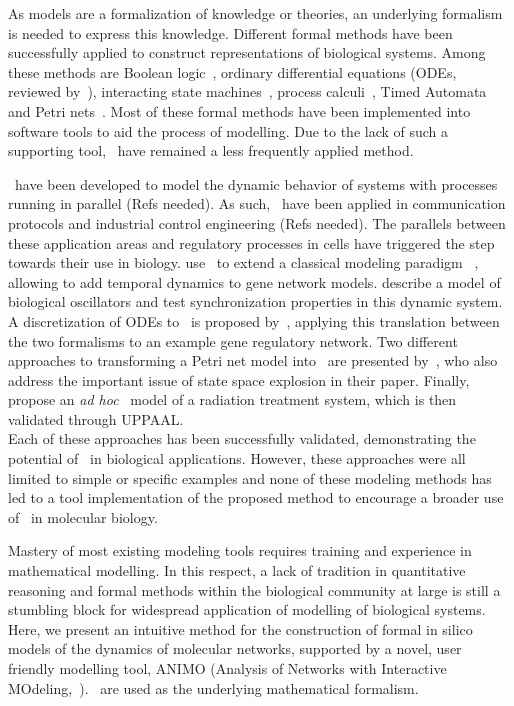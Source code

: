 As models are a formalization of knowledge or theories, an underlying formalism is needed to express
this knowledge. Different formal methods have been successfully applied to construct representations
of biological systems. Among these methods are Boolean logic~\citep{boolean-networks-flower,boolean-networks2},
ordinary differential equations (ODEs, reviewed by~\citealp[]{hidde-review}),
interacting state machines~\citep{interacting-sm1,interacting-sm2},
process calculi~\citep{blenx,bio-pepa}, Timed Automata~\citep{ta-siebert,bartocci-oscillators,
oded-ode-ta-discretization} and Petri nets~\citep{petri-nets,petri-nets2}.
Most of these formal methods have been implemented into software tools to aid the process
of modelling. Due to the lack of such a supporting tool, \tas\ have remained a less 
frequently applied method.

\tas\ have been developed to model the dynamic behavior of systems with processes running in parallel (Refs needed). 
As such, \tas\ have been applied in communication protocols and industrial control engineering (Refs needed). The 
parallels between these application areas and regulatory processes in cells have triggered the step towards 
their use in biology.
\cite{ta-siebert} use \tas\ to extend a classical modeling paradigm
~\citep{thomas-formalism}, allowing to add temporal dynamics to gene network models.
\cite{bartocci-oscillators} describe a model of biological oscillators and test 
synchronization properties in this dynamic system.
A discretization of ODEs to \tas\ is proposed by~\citet{oded-ode-ta-discretization}, applying
this translation between the two formalisms to an example gene regulatory network. Two 
different approaches to transforming
a Petri net model into \tas\ are presented by~\citet{ta-giapponesi},
who also address the important issue of state space explosion in their paper.
Finally, \cite{ta-radiazioni} propose an \emph{ad hoc} \tas\ model of a radiation treatment
system, which is then validated through UPPAAL.\\
Each of these approaches has been successfully validated, demonstrating the potential of \tas\
in biological applications. However, these approaches were all limited to simple
or specific examples and none of these modeling methods
has led to a tool implementation of the proposed method to encourage a broader use
of \tas\ in molecular biology.

Mastery of most existing modeling tools requires training and experience in mathematical modelling. 
In this respect, a lack of tradition in quantitative
reasoning and formal methods within the biological community at large is still a stumbling block for
widespread application of modelling of biological systems. Here, we present an intuitive method for the
construction of formal in silico models of the dynamics of molecular networks, supported by a novel,
user friendly modelling tool, ANIMO (Analysis of Networks with Interactive 
MOdeling,~\citealp[]{animo-bibe}). \tas\ are used as the underlying mathematical formalism.

